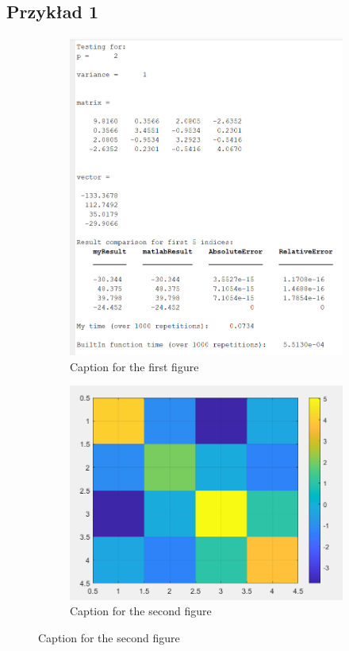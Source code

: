 \documentclass{article}
\begin{document}
    \subsection*{Przykład 1}
    \vspace{12pt}
    \begin{figure}[hbt!]
        \centering

        \begin{subfigure}{0.45\linewidth}
            \includegraphics[width=\linewidth]{img/fig1.png}
            \caption{Caption for the first figure}
        \end{subfigure}
        \hfill
        \begin{subfigure}{0.45\linewidth}
            \includegraphics[width=\linewidth]{img/mat1.png}
            \caption{Caption for the second figure}
        \end{subfigure}


\end{figure}
\end{document}
